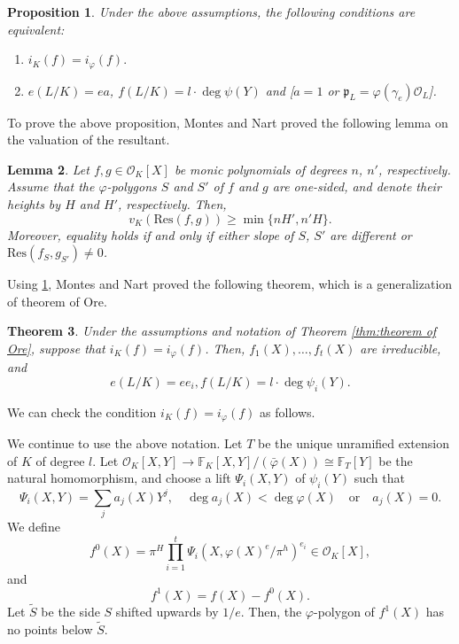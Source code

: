 \documentclass[10pt,a4paper]{amsart}
\newcommand{\field}[1]{\mathbb{#1}}
\newtheorem{theorem}{Theorem}[section]
\newtheorem{lemma}[theorem]{Lemma}
\newtheorem{proposition}[theorem]{Proposition}
\numberwithin{equation}{section}
\begin{document}
    \begin{proposition}\label{prop:prop of Montes Nart}\cite[Proposition]{MR1152908}
      Under the above assumptions, the following conditions are equivalent: 
      \begin{enumerate}
        \item $i_K(f) = i_{\varphi}(f).$

        \item $e(L/K) = ea$, $f(L/K) = l \cdot \deg\psi(Y)$ and 
        [$a = 1$ or $\mathfrak{p}_L = \varphi(\gamma_e)\mathcal{O}_L$]. 
      \end{enumerate}
    \end{proposition}

    To prove the above proposition, Montes and Nart proved the following lemma on the valuation of the resultant. 
    
    \begin{lemma}\label{lem:valuation of resultant}\cite[Lemma 2]{MR1152908}
      Let $f,g \in \mathcal{O}_K[X]$ be monic polynomials of degrees $n$, $n'$, respectively. 
      Assume that the $\varphi$-polygons $S$ and $S'$ of $f$ and $g$ are one-sided, and denote their heights by $H$ and $H'$, respectively. 
      Then, 
      \[
        v_K(\mathrm{Res}(f,g)) \ge \min\{nH',n'H\}. 
      \]
      Moreover, equality holds if and only if either slope of $S$, $S'$ are different or $\mathrm{Res}(f_S,g_{S'}) \ne 0$. 
    \end{lemma}

     Using \cref{prop:prop of Montes Nart}, Montes and Nart proved the following theorem, which is a generalization of theorem of Ore.

    \begin{theorem}\label{thm:theorem of Montes Nart}\cite[Theorem 1]{MR1152908}
      Under the assumptions and notation of Theorem \ref{thm:theorem of Ore}, suppose that $i_K(f) = i_{\varphi}(f)$. 
      Then, $f_1(X), \dots ,f_t(X)$ are irreducible, and 
      \[
        e(L/K) = ee_i, f(L/K) = l\cdot\deg\psi_i(Y). 
      \]
    \end{theorem}

    We can check the condition $i_K(f) = i_{\varphi}(f)$ as follows.

    We continue to use the above notation. 
    Let $T$ be the unique unramified extension of $K$ of degree $l$. 
    Let $\mathcal{O}_K[X,Y] \to \field{F}_K[X,Y]/(\bar{\varphi}(X)) \cong \field{F}_T[Y]$ be the natural homomorphism, 
    and choose a lift $\Psi_i(X,Y)$ of $\psi_i(Y)$ such that 
    \[
      \Psi_i(X,Y) = \sum_j a_j(X)Y^j,\quad \deg a_j(X) < \deg\varphi(X) \quad \text{or} \quad a_j(X) = 0. 
    \]
    We define 
    \[
      f^0(X) = \pi^H \prod_{i = 1}^t \Psi_i(X,\varphi(X)^e/\pi^h)^{e_i} \in \mathcal{O}_K[X], 
    \]
    and 
    \[
      f^1(X) = f(X) - f^0(X). 
    \]
    Let $\tilde{S}$ be the side $S$ shifted upwards by $1/e$. 
    Then, the $\varphi$-polygon of $f^1(X)$ has no points below $\tilde{S}$. 
\end{document}
